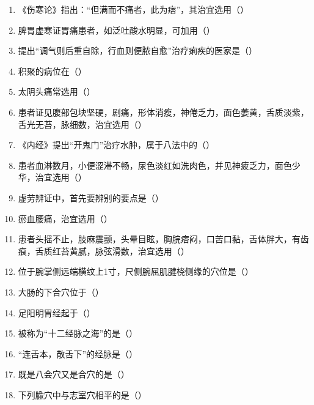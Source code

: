 \documentclass[a4paper,11pt]{ctexart}
\begin{document}
\begin{enumerate}
      \item 《伤寒论》指出：“但满而不痛者，此为痞”，其治宜选用（\quad）
      \item 脾胃虚寒证胃痛患者，如泛吐酸水明显，可加用（\quad）
      \item 提出“调气则后重自除，行血则便脓自愈”治疗痢疾的医家是（\quad）
      \item 积聚的病位在（\quad）
      \item 太阴头痛常选用（\quad）
      \item 患者证见腹部包块坚硬，剧痛，形体消瘦，神倦乏力，面色萎黄，舌质淡紫，舌光无苔，脉细数，治宜选用（\quad）
      \item 《内经》提出“开鬼门”治疗水肿，属于八法中的（\quad）
      \item 患者血淋数月，小便涩滞不畅，尿色淡红如洗肉色，并见神疲乏力，面色少华，治宜选用（\quad）
      \item 虚劳辨证中，首先要辨别的要点是（\quad）
      \item 瘀血腰痛，治宜选用（\quad）
      \item 患者头摇不止，肢麻震颤，头晕目眩，胸脘痞闷，口苦口黏，舌体胖大，有齿痕，舌质红苔黄腻，脉弦滑数，治宜选用（\quad）
      \item 位于腕掌侧远端横纹上1寸，尺侧腕屈肌腱桡侧缘的穴位是（\quad）
      \item 大肠的下合穴位于（\quad）
      \item 足阳明胃经起于（\quad）
      \item 被称为“十二经脉之海”的是（\quad）
      \item “连舌本，散舌下”的经脉是（\quad）
      \item 既是八会穴又是合穴的是（\quad）
      \item 下列腧穴中与志室穴相平的是（\quad）
\end{enumerate}
\end{document}
